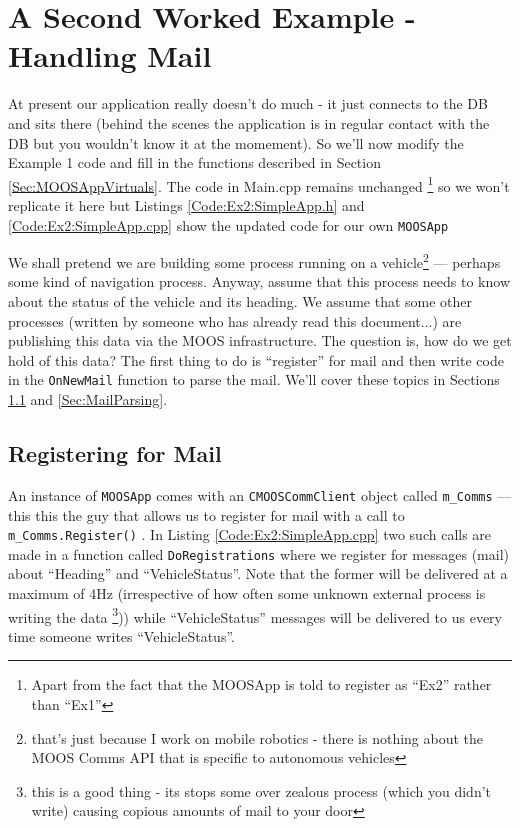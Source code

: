 \documentclass[a4paper,10pt]{article}
\newcommand{\Code}[1]{\texttt{#1} }
\newcommand{\code}[1]{\Code{#1} }
\begin{document}
\section{A Second Worked Example - Handling Mail}

At present our application really doesn't do much - it just
connects to the DB and sits there (behind the scenes the
application is in regular contact with the DB but you wouldn't
know it at the momement). So we'll now modify the Example 1 code
and fill in the functions described in Section
\ref{Sec:MOOSAppVirtuals}. The code in Main.cpp remains unchanged \footnote{Apart from the fact that the MOOSApp is told to register as ``Ex2'' rather than ``Ex1''}
so we won't replicate it here but Listings
\ref{Code:Ex2:SimpleApp.h} and \ref{Code:Ex2:SimpleApp.cpp} show
the updated code for our own \code{MOOSApp}

We shall pretend we are building some process running on a
vehicle\footnote{that's just because I work on mobile robotics -
there is nothing about the MOOS Comms API that is specific to
autonomous vehicles} --- perhaps some kind of navigation process.
Anyway, assume that this process needs to know about the status of
the vehicle and its heading. We assume that some other processes
(written by someone who has already read this document...) are
publishing this data via the MOOS infrastructure. The question is,
how do we get hold of this data? The first thing to do is
``register'' for mail and then write code in the \code{OnNewMail}
function to parse the mail. We'll cover these topics in Sections
\ref{Sec:Registering} and \ref{Sec:MailParsing}.






\subsection{Registering for Mail}\label{Sec:Registering}

An instance of \code{MOOSApp} comes with an \code{CMOOSCommClient}
object called \code{m\_Comms} --- this this the guy that allows us
to register for mail with a call to \code{m\_Comms.Register()}. In
Listing \ref{Code:Ex2:SimpleApp.cpp} two such calls are made in a
function called \code{DoRegistrations} where we register for
messages (mail) about ``Heading'' and ``VehicleStatus''. Note that
the former will be delivered at  a maximum of 4Hz (irrespective of
how often some unknown external process is writing the data
\footnote{this is a good thing - its stops some over zealous
process (which you didn't write) causing copious amounts of mail
to your door})) while ``VehicleStatus'' messages will be delivered
to us every time someone writes ``VehicleStatus''.
\end{document}
